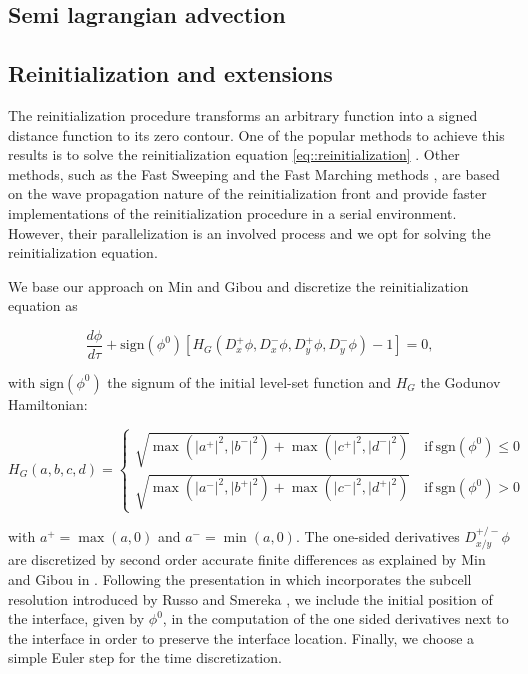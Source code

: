 \documentclass{elsarticle}
\begin{document}
\subsection{Semi lagrangian advection}

\subsection{Reinitialization and extensions} \label{section::reinitialization}

The reinitialization procedure transforms an arbitrary function into a signed distance function to its zero contour. One of the popular methods to achieve this results is to solve the reinitialization equation \ref{eq::reinitialization} \cite{Sussman:1994:levelsetincompressible, Min_Gibou:2007:Level_Set_Adaptive}. Other methods, such as the Fast Sweeping \cite{??} and the Fast Marching methods \cite{Sethian:1996:FMM, chopp:2001:fmm}, are based on the wave propagation nature of the reinitialization front and provide faster implementations of the reinitialization procedure in a serial environment. However, their parallelization is an involved process and we opt for solving the reinitialization equation.

We base our approach on Min and Gibou \cite{Min_Gibou:2007:Level_Set_Adaptive} and discretize the reinitialization equation as

\begin{equation*}
\frac{d\phi}{d\tau} + \mathrm{sign}(\phi^0)[H_G(D^+_x\phi, D^-_x\phi, D^+_y\phi, D^-_y\phi)-1] = 0,
\end{equation*}

with $\mathrm{sign}(\phi^0)$ the signum of the initial level-set function and $H_G$ the Godunov Hamiltonian:

\begin{equation*}
H_G(a,b,c,d) =
\begin{cases}
\sqrt{\max(\lvert a^+ \rvert^2, \lvert b^- \rvert^2) + \max(\lvert c^+ \rvert^2, \lvert d^- \rvert^2)} \quad \mathrm{if~sgn}(\phi^0) \leq 0\\
\sqrt{\max(\lvert a^- \rvert^2, \lvert b^+ \rvert^2) + \max(\lvert c^- \rvert^2, \lvert d^+ \rvert^2)} \quad \mathrm{if~sgn}(\phi^0) > 0
\end{cases}
\end{equation*}

with $a^+=\max(a,0)$ and $a^-=\min(a,0)$. The one-sided derivatives $D^{+/-}_{x/y}\phi$ are discretized by second order accurate finite differences as explained by Min and Gibou in \cite{Min_Gibou:2007:Level_Set_Adaptive}. Following the presentation in \cite{Min_Gibou:2007:Level_Set_Adaptive} which incorporates the subcell resolution introduced by Russo and Smereka \cite{Russo_Smereka}, we include the initial position of the interface, given by $\phi^0$, in the computation of the one sided derivatives next to the interface in order to preserve the interface location. Finally, we choose a simple Euler step for the time discretization.
\end{document}
